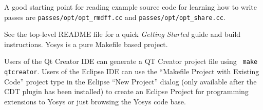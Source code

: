 A good starting point for reading example source code for learning how to write passes
are {\tt passes/opt/opt\_rmdff.cc} and {\tt passes/opt/opt\_share.cc}.

See the top-level README file for a quick {\it Getting Started} guide and build
instructions. Yosys is a pure Makefile based project.

Users of the Qt Creator IDE can generate a QT Creator project file using {\tt
make qtcreator}. Users of the Eclipse IDE can use the ``Makefile Project with
Existing Code'' project type in the Eclipse ``New Project'' dialog (only
available after the CDT plugin has been installed) to create an Eclipse Project
for programming extensions to Yosys or just browsing the Yosys code base.

